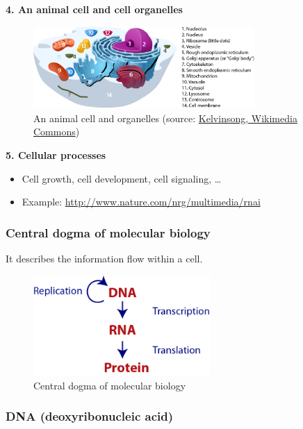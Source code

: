\noindent \textbf{4. An animal cell and cell organelles}
\begin{figure}[H]
  \centering
      \includegraphics[width=0.75\textwidth]{fig01/animal_cells_and_organelles.png}
  \caption{An animal cell and organelles (source: \href{https://en.wikipedia.org/wiki/Organelle\#/media/File:Animal_Cell.svg}{Kelvinsong, Wikimedia Commons})}
\end{figure}

\noindent \textbf{5. Cellular processes}
\begin{itemize}
\item Cell growth, cell development, cell signaling, …
\item Example: \url{http://www.nature.com/nrg/multimedia/rnai}
\end{itemize}

%
%
\subsubsection*{Central dogma of molecular biology}

It describes the information flow within a cell.

\begin{figure}[H]
  \centering
      \includegraphics[width=0.6\textwidth]{fig01/central_dogma_of_molecular_biology.png}
  \caption{Central dogma of molecular biology}
\end{figure}

%
%
\subsubsection*{DNA (deoxyribonucleic acid)}

